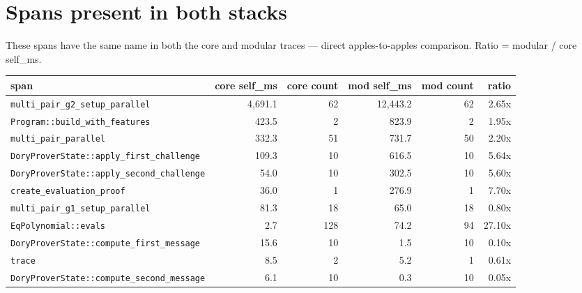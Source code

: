 \documentclass[10pt,a4paper]{article}
\begin{document}
\section{Spans present in both stacks}
These spans have the same name in both the core and modular traces — direct apples-to-apples comparison. Ratio = modular / core self\_ms.
\begin{longtable}{l r r r r r}
\toprule \textbf{span} & \textbf{core self\_ms} & \textbf{core count} & \textbf{mod self\_ms} & \textbf{mod count} & \textbf{ratio} \\ \midrule \endhead
\rowcolor{warn!18} \texttt{multi\_pair\_g2\_setup\_parallel} & 4,691.1 & 62 & 12,443.2 & 62 & 2.65x \\
 \texttt{Program::build\_with\_features} & 423.5 & 2 & 823.9 & 2 & 1.95x \\
\rowcolor{warn!18} \texttt{multi\_pair\_parallel} & 332.3 & 51 & 731.7 & 50 & 2.20x \\
\rowcolor{slowred!12} \texttt{DoryProverState::apply\_first\_challenge} & 109.3 & 10 & 616.5 & 10 & 5.64x \\
\rowcolor{slowred!12} \texttt{DoryProverState::apply\_second\_challenge} & 54.0 & 10 & 302.5 & 10 & 5.60x \\
\rowcolor{slowred!12} \texttt{create\_evaluation\_proof} & 36.0 & 1 & 276.9 & 1 & 7.70x \\
 \texttt{multi\_pair\_g1\_setup\_parallel} & 81.3 & 18 & 65.0 & 18 & 0.80x \\
\rowcolor{slowred!12} \texttt{EqPolynomial::evals} & 2.7 & 128 & 74.2 & 94 & 27.10x \\
 \texttt{DoryProverState::compute\_first\_message} & 15.6 & 10 & 1.5 & 10 & 0.10x \\
 \texttt{trace} & 8.5 & 2 & 5.2 & 1 & 0.61x \\
 \texttt{DoryProverState::compute\_second\_message} & 6.1 & 10 & 0.3 & 10 & 0.05x \\
\bottomrule \end{longtable}
\end{document}
